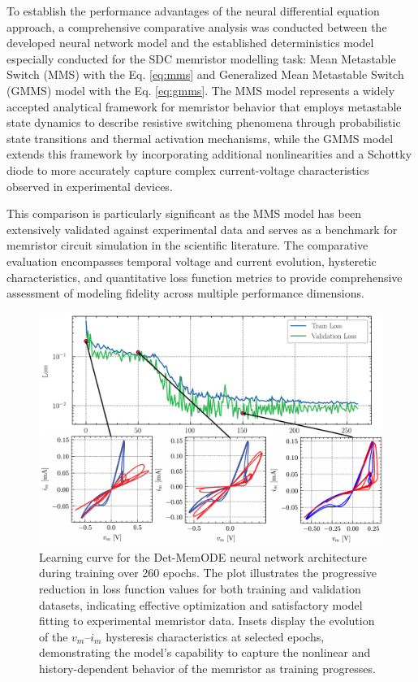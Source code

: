 \documentclass[11pt, oneside]{article}
\begin{document}
To establish the performance advantages of the neural differential equation approach, a comprehensive comparative analysis was conducted between the developed neural network model and the established deterministics model especially conducted for the SDC memristor modelling task: Mean Metastable Switch (MMS) with the Eq. \eqref{eq:mms} and Generalized Mean Metastable Switch (GMMS) model with the Eq. \eqref{eq:gmms}. The MMS model represents a widely accepted analytical framework for memristor behavior that employs metastable state dynamics to describe resistive switching phenomena through probabilistic state transitions and thermal activation mechanisms, while the GMMS model extends this framework by incorporating additional nonlinearities and a Schottky diode to more accurately capture complex current-voltage characteristics observed in experimental devices.

This comparison is particularly significant as the MMS model has been extensively validated against experimental data and serves as a benchmark for memristor circuit simulation in the scientific literature. The comparative evaluation encompasses temporal voltage and current evolution, hysteretic characteristics, and quantitative loss function metrics to provide comprehensive assessment of modeling fidelity across multiple performance dimensions.


\begin{figure}[ht]
    \centering
    \includegraphics[width=0.8\linewidth]{figs/Training_process.pdf}
    \caption{Learning curve for the Det-MemODE neural network architecture during training over 260 epochs. The plot illustrates the progressive reduction in loss function values for both training and validation datasets, indicating effective optimization and satisfactory model fitting to experimental memristor data. Insets display the evolution of the \(v_m\)--\(i_m\) hysteresis characteristics at selected epochs, demonstrating the model's capability to capture the nonlinear and history-dependent behavior of the memristor as training progresses.}
    \label{fig:learning-curve}
\end{figure}
\end{document}
